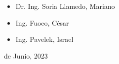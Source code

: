 \documentclass[main.tex]{subfiles}
\begin{document}
\begin{center}
		\begin{itemize}
			\item \fontsize{14}{\baselineskip}\selectfont Dr. Ing. Soria Llamedo, Mariano
			\item \fontsize{14}{\baselineskip}\selectfont Ing. Fuoco, César 
			\item \fontsize{14}{\baselineskip}\selectfont Ing. Pavelek, Israel
		\end{itemize}
		
		\bigskip
		\bigskip
		
		\vspace{5cm}
		
		 de Junio, 2023
		
	\end{center}
	
	\clearpage
	
\end{document}
